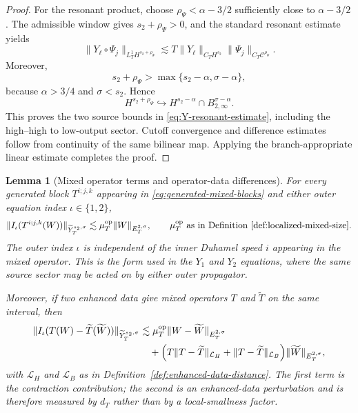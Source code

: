 \documentclass[10pt]{amsart}
\numberwithin{equation}{section}
\theoremstyle{plain}
\newtheorem{lemma}[theorem]{Lemma}
\theoremstyle{definition}
\theoremstyle{remark}
\begin{document}
\begin{proof}
For the resonant product, choose $\rho_\Psi<\alpha-3/2$ sufficiently close to $\alpha-3/2$.  The admissible window gives $s_2+\rho_\Psi>0$, and the standard resonant estimate yields
\begin{equation}\label{eq:Y-Psi-standard-resonant}
 \|Y_\ell\circ\Psi_j\|_{L_T^1H^{s_2+\rho_\Psi}}
 \lesssim
 T\|Y_\ell\|_{C_TH^{s_2}}\|\Psi_j\|_{C_T\mathcal C^{\rho_\Psi}}.
\end{equation}
Moreover,
\[
 s_2+\rho_\Psi>\max\{s_2-\alpha,\sigma-\alpha\},
\]
because $\alpha>3/4$ and $\sigma<s_2$.  Hence
\[
 H^{s_2+\rho_\Psi}\hookrightarrow
 H^{s_2-\alpha}\cap B_{2,\infty}^{\sigma-\alpha}.
\]
This proves the two source bounds in \eqref{eq:Y-resonant-estimate}, including the high--high to low-output sector.  Cutoff convergence and difference estimates follow from continuity of the same bilinear map.  Applying the branch-appropriate linear estimate completes the proof.
\end{proof}

\begin{lemma}[Mixed operator terms and operator-data differences]\label{lem:mixed-operator-Y}
For every generated block $T^{i;j,k}$ appearing in \eqref{eq:generated-mixed-blocks} and either outer equation index $\iota\in\{1,2\}$,
\begin{equation}\label{eq:mixed-operator-Y-estimate}
\|I_\iota(T^{i;j,k}(W))\|_{\widetilde Y_T^{s_2,\sigma}}
\lesssim
\mu_T^{\rm op}\|W\|_{E_T^{2,\sigma}},
\qquad \mu_T^{\rm op}\text{ as in Definition~\ref{def:localized-mixed-size}.}
\end{equation}
The outer index $\iota$ is independent of the inner Duhamel speed $i$ appearing in the mixed operator.  This is the form used in the $Y_1$ and $Y_2$ equations, where the same source sector may be acted on by either outer propagator.

Moreover, if two enhanced data give mixed operators $T$ and $\widetilde T$ on the same interval, then
\begin{equation}\label{eq:mixed-operator-Y-difference}
\begin{aligned}
\|I_\iota(T(W)-\widetilde T(\widetilde W))\|_{\widetilde Y_T^{s_2,\sigma}}
&\lesssim \mu_T^{\rm op}\|W-\widetilde W\|_{E_T^{2,\sigma}}  \\
&\quad +\Bigl(T\|T-\widetilde T\|_{\mathcal L_H}
       +\|T-\widetilde T\|_{\mathcal L_B}\Bigr)
       \|\widetilde W\|_{E_T^{2,\sigma}},
\end{aligned}
\end{equation}
with $\mathcal L_H$ and $\mathcal L_B$ as in Definition~\ref{def:enhanced-data-distance}.  The first term is the contraction contribution; the second is an enhanced-data perturbation and is therefore measured by $d_T$ rather than by a local-smallness factor.
\end{lemma}
\end{document}
